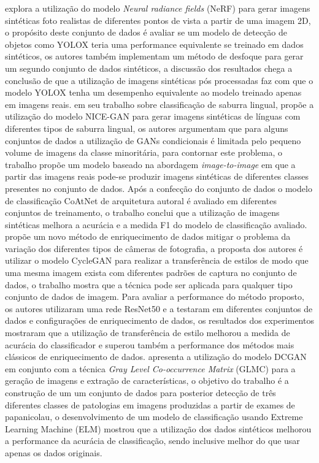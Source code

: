  explora a utilização do modelo \textit{Neural radiance fields} (NeRF) para gerar imagens sintéticas foto realistas de diferentes pontos de vista a partir de uma imagem 2D, o propósito deste conjunto de dados é avaliar se um modelo de detecção de objetos como YOLOX teria uma performance equivalente se treinado em dados sintéticos, os autores também implementam um método de desfoque para gerar um segundo conjunto de dados sintéticos, a discussão dos resultados chega a conclusão de que a utilização de imagens sintéticas pós processadas faz com que o modelo YOLOX tenha um desempenho equivalente ao modelo treinado apenas em imagens reais.
 em seu trabalho sobre classificação de saburra lingual, propõe a utilização do modelo NICE-GAN para gerar imagens sintéticas de línguas com diferentes tipos de saburra lingual, os autores argumentam que para alguns conjuntos de dados a utilização de GANs condicionais é limitada pelo pequeno volume de imagens da classe minoritária, para contornar este problema, o trabalho propõe um modelo baseado na abordagem \textit{image-to-image} em que a partir das imagens reais pode-se produzir imagens sintéticas de diferentes classes presentes no conjunto de dados. Após a confecção do conjunto de dados o modelo de classificação CoAtNet de arquitetura autoral é avaliado em diferentes conjuntos de treinamento, o trabalho conclui que a utilização de imagens sintéticas melhora a acurácia e a medida F1 do modelo de classificação avaliado.
 propõe um novo método de enriquecimento de dados mitigar o problema da variação dos diferentes tipos de câmeras de fotografia, a proposta dos autores é utilizar o modelo CycleGAN para realizar a transferência de estilos de modo que uma mesma imagem exista com diferentes padrões de captura no conjunto de dados, o trabalho mostra que a técnica pode ser aplicada para qualquer tipo conjunto de dados de imagem. Para avaliar a performance do método proposto, os autores utilizaram uma rede ResNet50 e a testaram em diferentes conjuntos de dados e configurações de enriquecimento de dados, os resultados dos experimentos mostraram que a utilização de transferência de estilo melhorou a medida de acurácia do classificador e superou também a performance dos métodos mais clássicos de enriquecimento de dados.
 apresenta a utilização do modelo DCGAN em conjunto com a técnica \textit{Gray Level Co-occurrence Matrix} (GLMC) para a geração de imagens e extração de características, o objetivo do trabalho é a construção de um um conjunto de dados para posterior detecção de três diferentes classes de patologias em imagens produzidas a partir de exames de papanicolau, o desenvolvimento de um modelo de classificação usando Extreme Learning Machine (ELM) mostrou que a utilização dos dados sintéticos melhorou a performance da acurácia de classificação, sendo inclusive melhor do que usar apenas os dados originais. 

